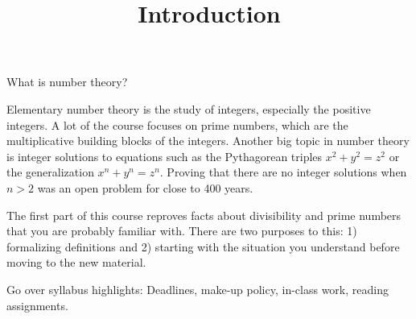 \documentclass{../ximera}
\title{Introduction}
\begin{document}
\begin{abstract}
\end{abstract}
\maketitle


What is number theory?

Elementary number theory is the study of integers, especially the positive integers. A lot of the course focuses on prime numbers, which are the multiplicative building blocks of the integers. Another big topic in number theory is integer solutions to equations such as the Pythagorean triples $x^2+y^2=z^2$ or the generalization $x^n+y^n=z^n$. Proving that there are no integer solutions when $n>2$ was an open problem for close to 400 years.

The first part of this course reproves facts about divisibility and prime numbers that you are probably familiar with. There are two purposes to this: 1) formalizing definitions and 2) starting with the situation you understand before moving to the new material.


\begin{instructorNotes}
  Go over syllabus highlights: Deadlines, make-up policy, in-class work, reading assignments.
\end{instructorNotes}
\end{document}
